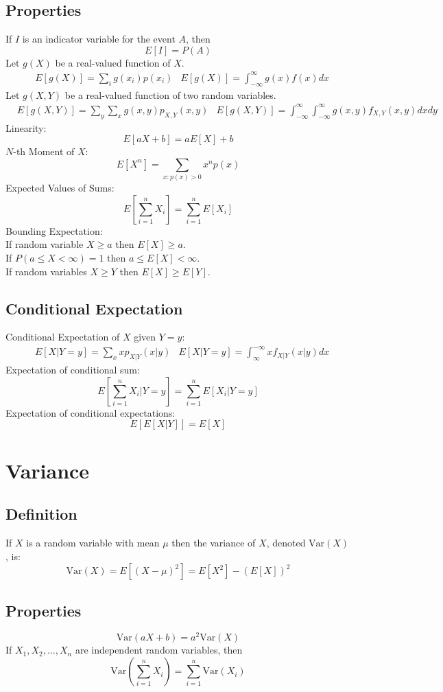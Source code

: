 \documentclass[12pt]{article}
\newcommand{\Var}{\text{Var}}
\begin{document}
\subsection{Properties}
If $I$ is an indicator variable for the event $A$, then
\[
    E[I] = P(A)
\]
Let $g(X)$ be a real-valued function of $X$.
\begin{align*}
    &E[g(X)] = \sum_{i} g(x_i)p(x_i) &E[g(X)] = \int_{-\infty}^{\infty} g(x) f(x) dx
\end{align*}
Let $g(X,Y)$ be a real-valued function of two random variables.
\begin{align*}
    &E[g(X,Y)] = \sum_y \sum_x g(x,y) p_{X,Y}(x,y)  &E[g(X,Y)] = \int_{-\infty}^{\infty} \int_{-\infty}^{\infty} g(x,y) f_{X,Y}(x,y) dx dy
\end{align*}
Linearity:
\[
    E[aX + b]  = aE[X] + b
\]
$N$-th Moment of $X$:
\[
    E[X^n] = \sum_{x: p(x) > 0} x^n p(x)
\]
Expected Values of Sums:
\[
    E\left[ \sum_{i=1}^n X_i \right] = \sum_{i=1}^n E[X_i]
\]
Bounding Expectation:\\
If random variable $X \geq a$ then $E[X] \geq a$. \\
If $P(a \leq X < \infty) = 1$ then $a \leq E[X] < \infty$. \\
If random variables $X \geq Y$ then $E[X] \geq E[Y]$.

\subsection{Conditional Expectation}
Conditional Expectation of $X$ given $Y=y$:
\begin{align*}
    &E[X|Y=y] = \sum_x x p_{X|Y}(x|y)   &E[X|Y=y] = \int_{\infty}^{-\infty} x f_{X|Y} (x|y) dx
\end{align*}
Expectation of conditional sum:
\[
    E\left[ \sum_{i=1}^n X_i | Y=y \right] = \sum_{i=1}^n E[X_i | Y=y]
\]
Expectation of conditional expectations:
\[
    E[E[X|Y]] = E[X]
\]


\section{Variance}
\subsection{Definition}
If $X$ is a random variable with mean $\mu$ then the variance of $X$, denoted $\Var(X)$, is:
\[
    \Var(X) = E[(X-\mu)^2] = E[X^2] - (E[X])^2
\]
\subsection{Properties}
\[
    \Var(aX + b) = a^2\Var(X)
\]
If $X_1, X_2, \ldots, X_n$ are independent random variables, then
\[
    \Var\left( \sum_{i=1}^n X_i \right) = \sum_{i=1}^n \Var(X_i)
\]
\end{document}
